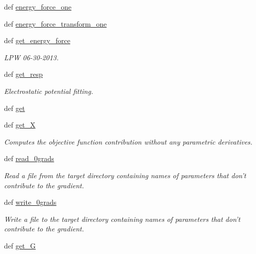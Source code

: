 \begin{DoxyCompactItemize}
def \hyperlink{classforcebalance_1_1abinitio_1_1AbInitio_a157be30ae6d556e17d8af30cefe393f4}{energy\-\_\-force\-\_\-one}
\item 
def \hyperlink{classforcebalance_1_1abinitio_1_1AbInitio_a961c909cf811a710095b091917c57d95}{energy\-\_\-force\-\_\-transform\-\_\-one}
\item 
def \hyperlink{classforcebalance_1_1abinitio_1_1AbInitio_ace85b4ad9266a96d16e39a4c6b440b7f}{get\-\_\-energy\-\_\-force}
\begin{DoxyCompactList}\small\item\em L\-P\-W 06-\/30-\/2013. \end{DoxyCompactList}\item 
def \hyperlink{classforcebalance_1_1abinitio_1_1AbInitio_a2e7f4452fb37b5e7eced48d8276741f5}{get\-\_\-resp}
\begin{DoxyCompactList}\small\item\em Electrostatic potential fitting. \end{DoxyCompactList}\item 
def \hyperlink{classforcebalance_1_1abinitio_1_1AbInitio_a2bb3ed7209707f688ec8b731392466b5}{get}
\item 
def \hyperlink{classforcebalance_1_1target_1_1Target_a606dd136f195c267c05a2455405e5949}{get\-\_\-\-X}
\begin{DoxyCompactList}\small\item\em Computes the objective function contribution without any parametric derivatives. \end{DoxyCompactList}\item 
def \hyperlink{classforcebalance_1_1target_1_1Target_a09bb0e8350a17974c908a9728b2709bf}{read\-\_\-0grads}
\begin{DoxyCompactList}\small\item\em Read a file from the target directory containing names of parameters that don't contribute to the gradient. \end{DoxyCompactList}\item 
def \hyperlink{classforcebalance_1_1target_1_1Target_acc7601caa4b719bf7e31961c2eb30dd7}{write\-\_\-0grads}
\begin{DoxyCompactList}\small\item\em Write a file to the target directory containing names of parameters that don't contribute to the gradient. \end{DoxyCompactList}\item 
def \hyperlink{classforcebalance_1_1target_1_1Target_afa8cc38c8bba8861c072e789717aa049}{get\-\_\-\-G}

\end{DoxyCompactItemize}
